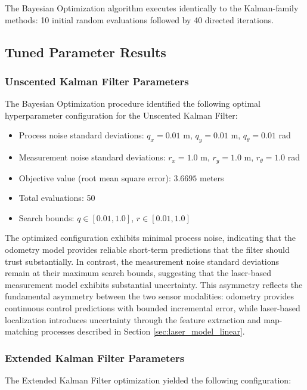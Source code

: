 \documentclass[conference]{IEEEtran}
\begin{document}
The Bayesian Optimization algorithm executes identically to the Kalman-family methods: 10 initial random evaluations followed by 40 directed iterations.

\subsection{Tuned Parameter Results}

\subsubsection{Unscented Kalman Filter Parameters}

The Bayesian Optimization procedure identified the following optimal hyperparameter configuration for the Unscented Kalman Filter:

\begin{itemize}
    \item Process noise standard deviations: $q_x = 0.01$ m, $q_y = 0.01$ m, $q_\theta = 0.01$ rad
    \item Measurement noise standard deviations: $r_x = 1.0$ m, $r_y = 1.0$ m, $r_\theta = 1.0$ rad
    \item Objective value (root mean square error): $3.6695$ meters
    \item Total evaluations: 50
    \item Search bounds: $q \in [0.01, 1.0]$, $r \in [0.01, 1.0]$
\end{itemize}

The optimized configuration exhibits minimal process noise, indicating that the odometry model provides reliable short-term predictions that the filter should trust substantially. In contrast, the measurement noise standard deviations remain at their maximum search bounds, suggesting that the laser-based measurement model exhibits substantial uncertainty. This asymmetry reflects the fundamental asymmetry between the two sensor modalities: odometry provides continuous control predictions with bounded incremental error, while laser-based localization introduces uncertainty through the feature extraction and map-matching processes described in Section \ref{sec:laser_model_linear}.

\subsubsection{Extended Kalman Filter Parameters}

The Extended Kalman Filter optimization yielded the following configuration:
\end{document}
